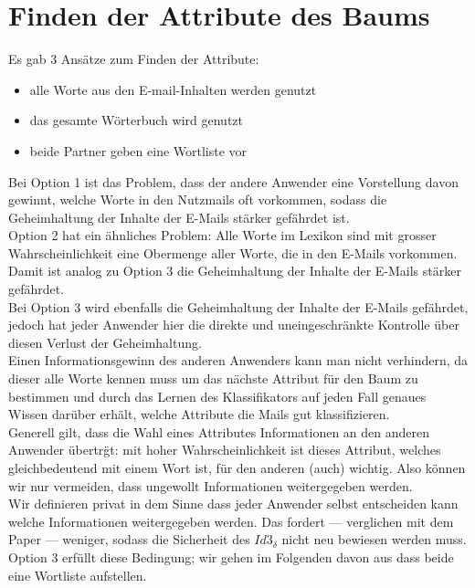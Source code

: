 \documentclass{article}
\begin{document}
\section{Finden der Attribute des Baums}
Es gab 3 Ans\"atze zum Finden der Attribute:
\begin{itemize}
\item alle Worte aus den E-mail-Inhalten werden genutzt
\item das gesamte W\"orterbuch wird genutzt
\item beide Partner geben eine Wortliste vor
\end{itemize}

Bei Option 1 ist das Problem, dass der andere Anwender eine Vorstellung davon
gewinnt, welche Worte in den Nutzmails oft vorkommen, sodass die Geheimhaltung
der Inhalte der E-Mails st\"arker gef\"ahrdet ist.\\
Option 2 hat ein \"ahnliches Problem: Alle Worte im Lexikon sind mit grosser
Wahrscheinlichkeit eine Obermenge aller Worte, die in den E-Mails vorkommen. 
Damit ist analog zu Option 3 die Geheimhaltung der Inhalte der E-Mails st\"arker
gef\"ahrdet.\\
Bei Option 3 wird ebenfalls die Geheimhaltung der Inhalte der E-Mails 
gef\"ahrdet, jedoch hat jeder Anwender hier die direkte und uneingeschr\"ankte
Kontrolle \"uber diesen Verlust der Geheimhaltung.\\
Einen Informationsgewinn des anderen Anwenders kann man nicht verhindern,
da dieser alle Worte kennen muss um das n\"achste Attribut f\"ur den Baum zu 
bestimmen und durch das Lernen des Klassifikators auf jeden Fall genaues
Wissen dar\"uber erh\"alt, welche Attribute die Mails gut klassifizieren.\\
Generell gilt, dass die Wahl eines Attributes Informationen an den anderen
Anwender \"ubertr\"gt: mit hoher Wahrscheinlichkeit ist dieses Attribut,
welches gleichbedeutend mit einem Wort ist, f\"ur den anderen (auch) wichtig. 
Also k\"onnen wir nur vermeiden, dass ungewollt Informationen weitergegeben 
werden.\\
Wir definieren privat in dem Sinne dass jeder Anwender selbst 
entscheiden kann welche Informationen weitergegeben werden. 
Das fordert --- verglichen mit dem Paper --- weniger, sodass die Sicherheit des 
\(Id3_\delta\) nicht neu bewiesen werden muss.\\
Option 3 erf\"ullt diese Bedingung; wir gehen im Folgenden davon aus dass
beide eine Wortliste aufstellen.
\end{document}
